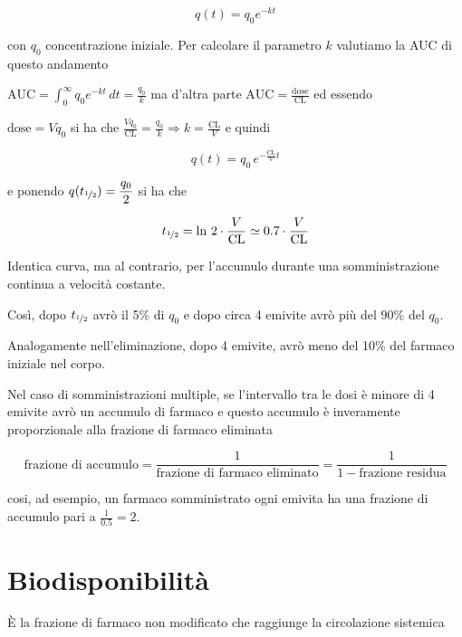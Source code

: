 $$
q(t)=q_0 e^{-kt}
$$

con $q_0$ concentrazione iniziale. Per calcolare il parametro $k$ valutiamo la AUC di questo andamento

$\text{AUC} =\displaystyle\int_0^\infty q_0e^{-kt}\,dt = \frac{q_0}{k}$ ma d'altra parte $\text{AUC} = \displaystyle\frac{\text{dose}}{\text{CL}}$ ed essendo 

$\text{dose} = Vq_0$ si ha che $\displaystyle\frac{Vq_0}{\text{CL}} = \frac{q_0}{k} \Rightarrow k = \frac{\text{CL}}{V}$ e quindi

$$q(t) = q_0\,e^{-\frac{\text{CL}}{V}t}$$

e ponendo $q(t_{\unitfrac{1}{2}}) = \displaystyle\frac{q_0}{2}$ si ha che

$$t_{\unitfrac{1}{2}}=\ln\,2\cdot\dfrac{V}{\text{CL}}\simeq0.7\cdot\dfrac{V}{\text{CL}}$$

Identica curva, ma al contrario, per l'accumulo durante una somministrazione continua a velocità costante.

Così, dopo $t_{\unitfrac 12}$ avrò il 5\% di $q_0$ e dopo circa 4 emivite avrò più del 90\% del $q_0$.

Analogamente nell'eliminazione, dopo 4 emivite, avrò meno del 10\% del farmaco iniziale nel corpo.

Nel caso di somministrazioni multiple, se l'intervallo tra le dosi è minore di 4 emivite avrò un accumulo di farmaco e questo accumulo è inveramente proporzionale alla frazione di farmaco eliminata

$$\text{frazione di accumulo} = \frac{1}{\text{frazione di farmaco eliminato}} = \frac{1}{1-\text{frazione residua}}$$

cosi, ad esempio, un farmaco somministrato ogni emivita ha una frazione di accumulo pari a $\frac{1}{0.5} = 2$.

\section{Biodisponibilità}

\`E la frazione di farmaco non modificato che raggiunge la circolazione sistemica


